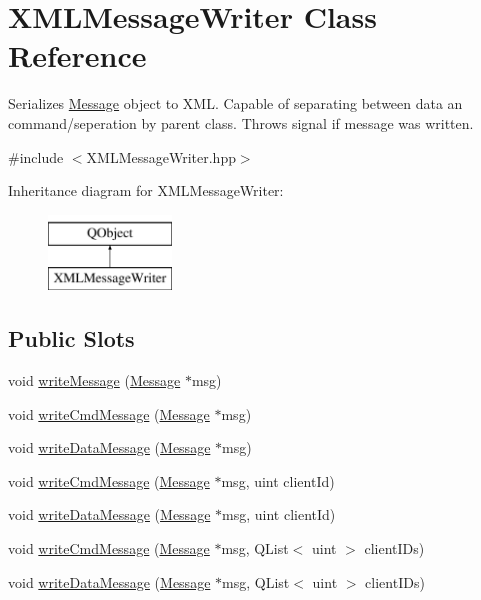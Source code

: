 \hypertarget{class_x_m_l_message_writer}{}\section{X\+M\+L\+Message\+Writer Class Reference}
\label{class_x_m_l_message_writer}


Serializes \hyperlink{class_message}{Message} object to X\+M\+L. Capable of separating between data an command/seperation by parent class. Throws signal if message was written.  




{\ttfamily \#include $<$X\+M\+L\+Message\+Writer.\+hpp$>$}

Inheritance diagram for X\+M\+L\+Message\+Writer\+:\begin{figure}[H]
\begin{center}
\leavevmode
\includegraphics[height=2.000000cm]{class_x_m_l_message_writer}
\end{center}
\end{figure}
\subsection*{Public Slots}
\begin{DoxyCompactItemize}
\item 
void \hyperlink{class_x_m_l_message_writer_a4617ce9dfb773a7b953698a9ac76e304}{write\+Message} (\hyperlink{class_message}{Message} $\ast$msg)
\item 
void \hyperlink{class_x_m_l_message_writer_aab22aefde8e912b7fec4e48179c150cc}{write\+Cmd\+Message} (\hyperlink{class_message}{Message} $\ast$msg)
\item 
void \hyperlink{class_x_m_l_message_writer_a2b42845809f577ecca73721b7811567a}{write\+Data\+Message} (\hyperlink{class_message}{Message} $\ast$msg)
\item 
void \hyperlink{class_x_m_l_message_writer_ad25173249a63731f6729204988d7ca81}{write\+Cmd\+Message} (\hyperlink{class_message}{Message} $\ast$msg, uint client\+Id)
\item 
void \hyperlink{class_x_m_l_message_writer_a938fff0a4092d2a87a4e4af7abb059c7}{write\+Data\+Message} (\hyperlink{class_message}{Message} $\ast$msg, uint client\+Id)
\item 
void \hyperlink{class_x_m_l_message_writer_a6b54512b3f7c1e6d13c882b4fefcff6e}{write\+Cmd\+Message} (\hyperlink{class_message}{Message} $\ast$msg, Q\+List$<$ uint $>$ client\+I\+Ds)
\item 
void \hyperlink{class_x_m_l_message_writer_a0148f8cfd8304e97f11ee12f5a112087}{write\+Data\+Message} (\hyperlink{class_message}{Message} $\ast$msg, Q\+List$<$ uint $>$ client\+I\+Ds)
\end{DoxyCompactItemize}
